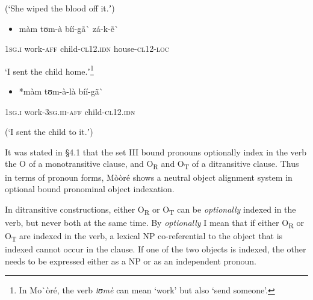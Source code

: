 \documentclass[output=paper]{langsci/langscibook}
\begin{document}
{{\begin{styleTranslation}
(‘She wiped the blood off it.ʼ)
\end{styleTranslation}

\begin{itemize}
\item \begin{styleNumberedEX}
\label{bkm:Ref424201799}m\`{a}m    tʊm-\`{a}    b\'{i}\'{i}-g\~{a}\`{ }      z\'{a}-k-\~{e}\`{ }
\end{styleNumberedEX}\end{itemize}
\begin{styleGloss}
\textsc{1sg.i  }  work-\textsc{aff}  child-\textsc{cl12.idn}  house-\textsc{cl12-loc}
\end{styleGloss}

\begin{styleTranslation}
‘I sent the child home.ʼ\footnote{ In Mo\`{ }\`{o}r\'{e}, the verb \textit{tʊm\`{e}} can mean ‘work’ but also ‘send someone’. }
\end{styleTranslation}

\begin{itemize}
\item \begin{styleNumberedEX}
\label{bkm:Ref424201839}*m\`{a}m  tʊm-\`{a}-l\`{a}      b\'{i}\'{i}-g\~{a}\`{ }
\end{styleNumberedEX}\end{itemize}
\begin{styleGloss}
\textsc{1sg.i  }  work-\textsc{3sg.iii-aff}    child-\textsc{cl12.idn}
\end{styleGloss}

\begin{styleTranslation}
(‘I sent the child to it.ʼ)
\end{styleTranslation}

It was stated in §4.1 that the set III bound pronouns optionally index in the verb the O of a monotransitive clause, and O\textsubscript{R} and O\textsubscript{T }of a ditransitive clause. Thus in terms of pronoun forms, M\`{o}\`{o}r\'{e} shows a neutral object alignment system in optional bound pronominal object indexation.  

In ditransitive constructions, either O\textsubscript{R} or O\textsubscript{T} can be \textit{optionally} indexed in the verb, but never both at the same time. By \textit{optionally} I mean that if either O\textsubscript{R} or O\textsubscript{T} are indexed in the verb, a lexical NP co-referential to the object that is indexed cannot occur in the clause. If one of the two objects is indexed, the other needs to be expressed either as a NP or as an independent pronoun. 

}}
\end{document}
